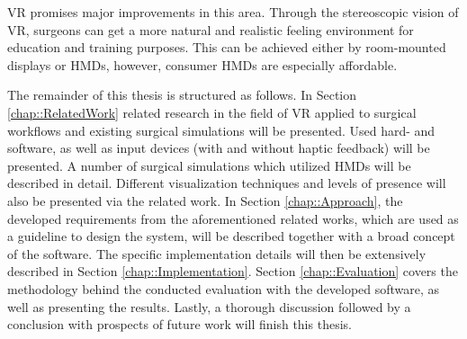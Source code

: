 VR promises major improvements in this area.
Through the stereoscopic vision of VR, surgeons can get a more natural and realistic feeling environment for education and training purposes.
This can be achieved either by room-mounted displays or HMDs, however, consumer HMDs are especially affordable.





The remainder of this thesis is structured as follows. 
In Section \ref{chap::RelatedWork} related research in the field of VR applied to surgical workflows and existing surgical simulations will be presented.
Used hard- and software, as well as input devices (with and without haptic feedback) will be presented.
A number of surgical simulations which utilized HMDs will be described in detail.
Different visualization techniques and levels of presence will also be presented via the related work.
In Section \ref{chap::Approach}, the developed requirements from the aforementioned related works, which are used as a guideline to design the system, will be described 
together with a broad concept of the software.
The specific implementation details will then be extensively described in Section \ref{chap::Implementation}.
Section \ref{chap::Evaluation} covers the methodology behind the conducted evaluation with the developed software, as well as presenting the results.
Lastly, a thorough discussion followed by a conclusion with prospects of future work will finish this thesis.